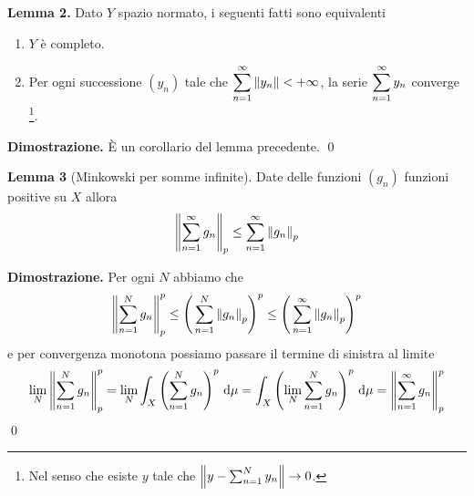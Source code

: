 \hypertarget{prop:completeness_lemma_2}{}
\textbf{Lemma 2.} 
Dato $Y$ spazio normato, i seguenti fatti sono equivalenti
\begin{enumerate}
	\item $Y$ è completo.

	\item Per ogni successione $(y_n)$ tale che $\displaystyle \sum_{n=1}^\infty \left\lVert y_n \right\rVert < +\infty$, la serie $\displaystyle \sum_{n=1}^\infty y_n$ converge \footnote{Nel senso che esiste $y$ tale che $\left\lVert y - \sum_{n=1}^N y_n \right\rVert \to 0$.}.
\end{enumerate}

\textbf{Dimostrazione.} 
È un corollario del lemma precedente. 
\qed

\hypertarget{prop:completeness_lemma_3}{}
\textbf{Lemma 3} 
(Minkowski per somme infinite). 
Date delle funzioni $(g_n)$ funzioni positive su $X$ allora
$$
\left\lVert \sum_{n=1}^\infty g_n \right\rVert_p \leq \sum_{n=1}^\infty \left\lVert g_n \right\rVert_p
$$

\textbf{Dimostrazione.}
Per ogni $N$ abbiamo che
$$
\left\lVert \sum_{n=1}^N g_n \right\rVert_p^p 
\leq \left( \,\sum_{n=1}^N \left\lVert g_n \right\rVert_p \right)^p 
\leq \left( \,\sum_{n=1}^\infty \left\lVert g_n \right\rVert_p \right)^p 
$$
e per convergenza monotona possiamo passare il termine di sinistra al limite
$$
\lim_N \left\lVert \sum_{n=1}^N g_n \right\rVert_p^p 
= \lim_N \int_X \left( \sum_{n=1}^N g_n \right)^p \,\mathrm{d} \mu
= \int_X \left( \lim_N \sum_{n=1}^N g_n \right)^p \,\mathrm{d} \mu
= \left\lVert \sum_{n=1}^\infty g_n \right\rVert_p^p
$$
\qed


